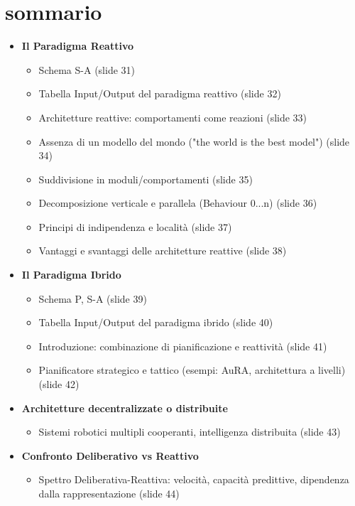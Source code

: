 


\section{sommario}

\begin{itemize}



 



    \item \textbf{Il Paradigma Reattivo}
    \begin{itemize}
        \item Schema S-A (slide 31)
        \item Tabella Input/Output del paradigma reattivo (slide 32)
        \item Architetture reattive: comportamenti come reazioni (slide 33)
        \item Assenza di un modello del mondo ("the world is the best model") (slide 34)
        \item Suddivisione in moduli/comportamenti (slide 35)
        \item Decomposizione verticale e parallela (Behaviour 0...n) (slide 36)
        \item Principi di indipendenza e località (slide 37)
        \item Vantaggi e svantaggi delle architetture reattive (slide 38)
    \end{itemize}

    \item \textbf{Il Paradigma Ibrido}
    \begin{itemize}
        \item Schema P, S-A (slide 39)
        \item Tabella Input/Output del paradigma ibrido (slide 40)
        \item Introduzione: combinazione di pianificazione e reattività (slide 41)
        \item Pianificatore strategico e tattico (esempi: AuRA, architettura a livelli) (slide 42)
    \end{itemize}

    \item \textbf{Architetture decentralizzate o distribuite}
    \begin{itemize}
        \item Sistemi robotici multipli cooperanti, intelligenza distribuita (slide 43)
    \end{itemize}

    \item \textbf{Confronto Deliberativo vs Reattivo}
    \begin{itemize}
        \item Spettro Deliberativa-Reattiva: velocità, capacità predittive, dipendenza dalla rappresentazione (slide 44)
    \end{itemize}
\end{itemize}

